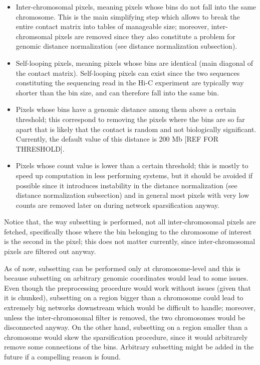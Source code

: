\begin{itemize}\tightlist
  \item Inter-chromosomal pixels, meaning pixels whose bins do not fall into the same chromosome. This is the main simplifying step which allows to break the entire contact matrix into tables of manageable size; moreover, inter-chromsomal pixels are removed since they also constitute a problem for genomic distance normalization (see distance normalization subsection).
  \item Self-looping pixels, meaning pixels whose bins are identical (main diagonal of the contact matrix). Self-looping pixels can exist since the two sequences constituting the sequencing read in the Hi-C experiment are typically way shorter than the bin size, and can therefore fall into the same bin.
  \item Pixels whose bins have a genomic distance among them above a certain threshold; this correspond to removing the pixels where the bins are so far apart that is likely that the contact is random and not biologically significant. Currently, the default value of this distance is 200 Mb [REF FOR THRESHOLD].
  \item Pixels whose count value is lower than a certain threshold; this is mostly to speed up computation in less performing systems, but it should be avoided if possible since it introduces instability in the distance normalization (see distance normalization subsection) and in general most pixels with very low counts are removed later on during network sparsification anyway.
\end{itemize}

Notice that, the way subsetting is performed, not all inter-chromosomal pixels are fetched, specifically those where the bin belonging to the chromosome of interest is the second in the pixel; this does not matter currently, since inter-chromosomal pixels are filtered out anyway. 

As of now, subsetting can be performed only at chromosome-level and this is because subsetting on arbitrary genomic coordinates would lead to some issues. Even though the preprocessing procedure would work without issues (given that it is chunked), subsetting on a region bigger than a chromosome could lead to extremely big networks downstream which would be difficult to handle; moreover, unless the inter-chromosomal filter is removed, the two chromosomes would be disconnected anyway. On the other hand, subsetting on a region smaller than a chromosome would skew the sparsification procedure, since it would arbitrarely remove some connections of the bins. Arbitrary subsetting might be added in the future if a compelling reason is found.

